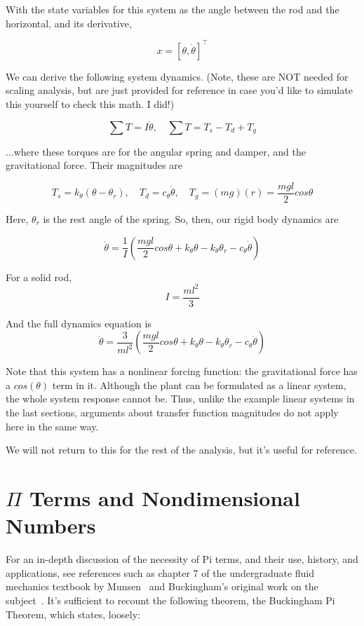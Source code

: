 \documentclass[12pt,letterpaper]{article}
\begin{document}
With the state variables for this system as the angle between the rod and the horizontal, and its derivative,

\[
x = [\theta, \dot \theta]^\top
\]

We can derive the following system dynamics. 
(Note, these are NOT needed for scaling analysis, but are just provided for reference in case you'd like to simulate this yourself to check this math. I did!)

\[
\sum T = I \ddot \theta, \quad \sum T = T_s - T_d + T_g
\]

...where these torques are for the angular spring and damper, and the gravitational force. Their magnitudes are

\[
T_s = k_{\theta}(\theta - \theta_r), \quad T_d = c_{\theta} \dot \theta, \quad T_g = (mg)(r) = \frac{mgl}{2} cos \theta
\]

Here, $\theta_r$ is the rest angle of the spring. So, then, our rigid body dynamics are

\[
\ddot \theta = \frac{1}{I} (\frac{mgl}{2} cos \theta + k_{\theta} \theta - k_{\theta} \theta_r - c_{\theta} \dot \theta )
\]

For a solid rod,
\[
I = \frac{m l^2}{3}
\]


And the full dynamics equation is
\[
\ddot \theta = \frac{3}{m l^2} (\frac{mgl}{2} cos \theta + k_{\theta} \theta - k_{\theta} \theta_r - c_{\theta} \dot \theta )
\]

Note that this system has a nonlinear forcing function: the gravitational force has a $cos(\theta)$ term in it.
Although the plant can be formulated as a linear system, the whole system response cannot be.
Thus, unlike the example linear systems in the last sections, arguments about transfer function magnitudes do not apply here in the same way.

We will not return to this for the rest of the analysis, but it's useful for reference.

\section{$\Pi$ Terms and Nondimensional Numbers}

For an in-depth discussion of the necessity of Pi terms, and their use, history, and applications, see references such as chapter 7 of the undergraduate fluid mechanics textbook by Munsen~\cite{munson2013fundamentals} and Buckingham's original work on the subject~\cite{buckingham1914physically}.
It's sufficient to recount the following theorem, the Buckingham Pi Theorem, which states, loosely: \\
\end{document}
